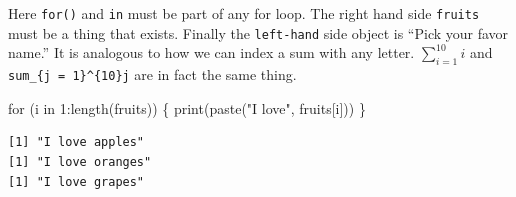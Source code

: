 \documentclass[
  letterpaper,
]{book}
\newenvironment{Shaded}{\begin{snugshade}}{\end{snugshade}}
\newcommand{\AttributeTok}[1]{\textcolor[rgb]{0.40,0.45,0.13}{#1}}
\newcommand{\ControlFlowTok}[1]{\textcolor[rgb]{0.00,0.23,0.31}{#1}}
\newcommand{\DecValTok}[1]{\textcolor[rgb]{0.68,0.00,0.00}{#1}}
\newcommand{\FunctionTok}[1]{\textcolor[rgb]{0.28,0.35,0.67}{#1}}
\newcommand{\NormalTok}[1]{\textcolor[rgb]{0.00,0.23,0.31}{#1}}
\newcommand{\OtherTok}[1]{\textcolor[rgb]{0.00,0.23,0.31}{#1}}
\newcommand{\SpecialCharTok}[1]{\textcolor[rgb]{0.37,0.37,0.37}{#1}}
\newcommand{\StringTok}[1]{\textcolor[rgb]{0.13,0.47,0.30}{#1}}
\theoremstyle{definition}
\theoremstyle{definition}
\theoremstyle{plain}
\theoremstyle{definition}
\theoremstyle{plain}
\theoremstyle{plain}
\theoremstyle{remark}
\begin{document}
Here \texttt{for()} and \texttt{in} must be part of any for loop. The
right hand side \texttt{fruits} must be a thing that exists. Finally the
\texttt{left-hand} side object is ``Pick your favor name.'' It is
analogous to how we can index a sum with any letter.
\(\sum_{i=1}^{10}i\) and \texttt{sum\_\{j\ =\ 1\}\^{}\{10\}j} are in
fact the same thing.

\begin{Shaded}
\begin{Highlighting}[]
\ControlFlowTok{for}\NormalTok{ (i }\ControlFlowTok{in} \DecValTok{1}\SpecialCharTok{:}\FunctionTok{length}\NormalTok{(fruits)) \{}
  \FunctionTok{print}\NormalTok{(}\FunctionTok{paste}\NormalTok{(}\StringTok{"I love"}\NormalTok{, fruits[i]))}
\NormalTok{\}}
\end{Highlighting}
\end{Shaded}

\begin{verbatim}
[1] "I love apples"
[1] "I love oranges"
[1] "I love grapes"
\end{verbatim}

\begin{Shaded}
\end{Shaded}
\end{document}
